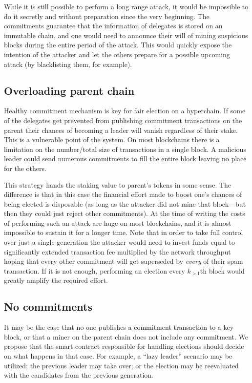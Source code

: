 While it is still possible to perform a long range attack, it would be
impossible to do it secretly and without preparation since the very beginning.
The commitments guarantee that the information of delegates is stored on an
immutable chain, and one would need to announce their will of mining suspicious
blocks during the entire period of the attack. This would quickly expose the
intention of the attacker and let the others prepare for a possible upcoming
attack (by blacklisting them, for example).

\subsection{Overloading parent chain}

Healthy commitment mechanism is key for fair election on a hyperchain. If some
of the delegates get prevented from publishing commitment transactions on the
parent their chances of becoming a leader will vanish regardless of their stake.
This is a vulnerable point of the system. On most blockchains there is a
limitation on the number/total size of transactions in a single block. A
malicious leader could send numerous commitments to fill the entire block
leaving no place for the others.

This strategy hands the staking value to parent's tokens in some sense. The
difference is that in this case the financial effort made to boost one's chances
of being elected is disposable (as long as the attacker did not mine that
block---but then they could just reject other commitments). At the time of
writing the costs of performing such an attack are huge on most blockchains, and
it is almost impossible to sustain it for a longer time. Note that in order to
take full control over just a single generation the attacker would need to
invest funds equal to significantly extended transaction fee multiplied by the
network throughput hoping that every other commitment will get superseded by
\textit{every} of their spam transaction. If it is not enough, performing an
election every $k_{> 1}$th block would greatly amplify the required effort.

\subsection{No commitments}

It may be the case that no one publishes a commitment transaction to a key
block, or that a miner on the parent chain does not include any commitment. We
propose that the smart contract responsible for handling elections should decide
on what happens in that case. For example, a ``lazy leader'' scenario may be
utilized; the previous leader may take over; or the election may be reevaluated
with the candidates from the previous generation.
